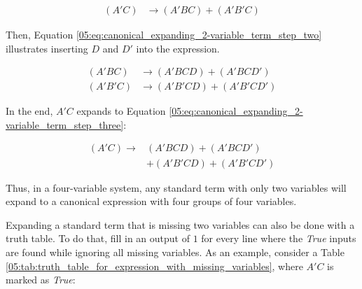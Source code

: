 \begin{align}
  \label{05:eq:canonical_expanding_2-variable_term_step_one}
  (A'C) &\rightarrow (A'BC)+(A'B'C)
\end{align}

Then, Equation \ref{05:eq:canonical_expanding_2-variable_term_step_two} illustrates inserting $ D $ and $ D' $ into the expression.

\begin{align}
  \label{05:eq:canonical_expanding_2-variable_term_step_two}
  (A'BC) &\rightarrow (A'BCD)+(A'BCD') \\
  \nonumber
  (A'B'C) &\rightarrow (A'B'CD)+(A'B'CD')
\end{align}

In the end, $ A'C $ expands to Equation \ref{05:eq:canonical_expanding_2-variable_term_step_three}:

\begin{align}
  \label{05:eq:canonical_expanding_2-variable_term_step_three}
  (A'C) \rightarrow &(A'BCD) + (A'BCD') \\
  \nonumber
  &+ (A'B'CD) + (A'B'CD')
\end{align}

Thus, in a four-variable system, any standard term with only two variables will expand to a canonical expression with four groups of four variables.

Expanding a standard term that is missing two variables can also be done with a truth table. To do that, fill in an output of $ 1 $ for every line where the \emph{True} inputs are found while ignoring all missing variables. As an example, consider a Table \ref{05:tab:truth_table_for_expression_with_missing_variables}, where $ A'C $ is marked as \emph{True}:

